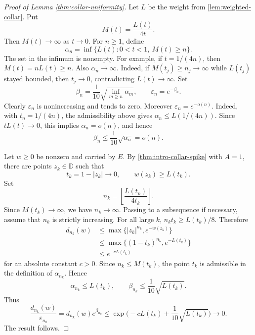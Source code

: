 \documentclass[10pt,a4paper]{amsart}
\newcommand{\D}{\mathbb D}
\newcommand{\eps}{\varepsilon}
\begin{document}
\begin{proof}[Proof of Lemma \ref{thm:collar-uniformity}]
Let $L$ be the weight from \cref{lem:weighted-collar}.  Put
$$
        M(t)=\frac{L(t)}{4t}.
$$
Then $M(t)\to\infty$ as $t\to 0$.  For $n\ge1$, define
$$
        \alpha_n=\inf\{L(t):0<t<1,\ M(t)\ge n\}.
$$
The set in the infimum is nonempty. For example, if $t=1/(4n)$, then
$M(t)=nL(t)\ge n$.  
Also $\alpha_n\to\infty$.  Indeed, if
$M(t_j)\ge n_j\to\infty$ while $L(t_j)$ stayed bounded, then
$t_j\to0$, contradicting $L(t)\to\infty$.
Set
$$
        \beta_n=\frac1{10}\sqrt{\inf_{m\geq n}\alpha_m},
        \qquad
        \eps_n=e^{-\beta_n}.
$$
Clearly $\eps_n$ is
nonincreasing and tends to zero.  Moreover $\eps_n=e^{-o(n)}$.  Indeed,
with $t_n=1/(4n)$, the admissibility above gives
$
        \alpha_n\le L(1/(4n)).
$
Since $tL(t)\to0$, this implies $\alpha_n=o(n)$, and hence
$$
        \beta_n\le \frac1{10}\sqrt{\alpha_n}=o(n).
$$

Let $w\ge0$ be nonzero and carried by $E$.  By
\cref{thm:intro-collar-spike} with $A=1$, there are points $z_k\in\D$ such that
$$
        t_k=1-|z_k|\to0,
        \qquad
        w(z_k)\ge L(t_k).
$$
Set
$$
        n_k=\left\lfloor\frac{L(t_k)}{4t_k}\right\rfloor.
$$
Since $M(t_k)\to\infty$, we have $n_k\to\infty$.  Passing to a subsequence
if necessary, assume that $n_k$ is strictly increasing.  For all large $k$,
$
        n_k t_k\geq L(t_k)/8.
$
Therefore
$$
\begin{aligned}
        d_{n_k}(w)
        &\le \max\{|z_k|^{n_k},e^{-w(z_k)}\} \\
        &\le \max\{(1-t_k)^{n_k},e^{-L(t_k)}\} \\
        &\le e^{-cL(t_k)}
\end{aligned}
$$
for an absolute constant $c>0$.  Since $n_k\le M(t_k)$, the point $t_k$
is admissible in the definition of $\alpha_{n_k}$.  Hence
$$
        \alpha_{n_k}\le L(t_k),
        \qquad
        \beta_{n_k}\le \frac1{10}\sqrt{L(t_k)}.
$$
Thus
$$
        \frac{d_{n_k}(w)}{\eps_{n_k}}
        =d_{n_k}(w)e^{\beta_{n_k}}
        \le
        \exp\big(-cL(t_k)+\frac1{10}\sqrt{L(t_k)}\big)
        \longrightarrow0.
$$
The result follows.
\end{proof}
\end{document}
